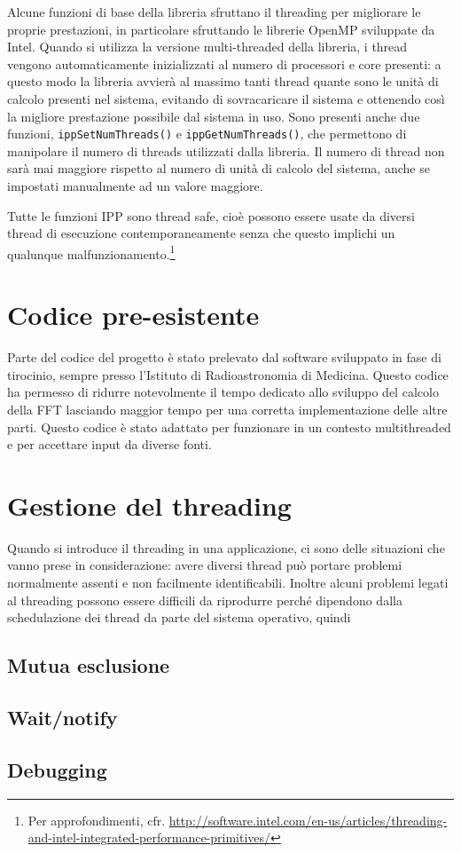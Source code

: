Alcune funzioni di base della libreria sfruttano il threading per migliorare le
proprie prestazioni, in particolare sfruttando le librerie OpenMP sviluppate da
Intel. Quando si utilizza la versione multi-threaded della libreria, i thread
vengono automaticamente inizializzati al numero di processori e core presenti: a
questo modo la libreria avvier\`a al massimo tanti thread quante sono le unit\`a
di calcolo presenti nel sistema, evitando di sovracaricare il sistema e
ottenendo cos\`i la migliore prestazione possibile dal sistema in uso. Sono
presenti anche due funzioni, \texttt{ippSetNumThreads()} e
\texttt{ippGetNumThreads()}, che permettono di manipolare il numero di threads
utilizzati dalla libreria. Il numero di thread non sar\`a mai maggiore rispetto
al numero di unit\`a di calcolo del sistema, anche se impostati manualmente ad
un valore maggiore.

Tutte le funzioni IPP sono thread safe, cio\`e possono essere usate da diversi
thread di esecuzione contemporaneamente senza che questo implichi un qualunque
malfunzionamento.\footnote{Per approfondimenti, cfr.
\url{http://software.intel.com/en-us/articles/threading-and-intel-integrated-performance-primitives/}}


\section{Codice pre-esistente}
Parte del codice del progetto \`e stato prelevato dal software sviluppato in
fase di tirocinio, sempre presso l'Istituto di Radioastronomia di Medicina.
Questo codice ha permesso di ridurre notevolmente il tempo dedicato allo
sviluppo del calcolo della \ac{FFT} lasciando maggior tempo per una corretta
implementazione delle altre parti. Questo codice \`e stato adattato per
funzionare in un contesto multithreaded e per accettare input da diverse fonti.

\section{Gestione del threading}
Quando si introduce il threading in una applicazione, ci sono delle situazioni
che vanno prese in considerazione: avere diversi thread pu\`o portare problemi
normalmente assenti e non facilmente identificabili. Inoltre alcuni problemi
legati al threading possono essere difficili da riprodurre perch\'e  dipendono
dalla schedulazione dei thread da parte del sistema operativo, quindi 
\subsection{Mutua esclusione}
\subsection{Wait/notify}
\subsection{Debugging}
